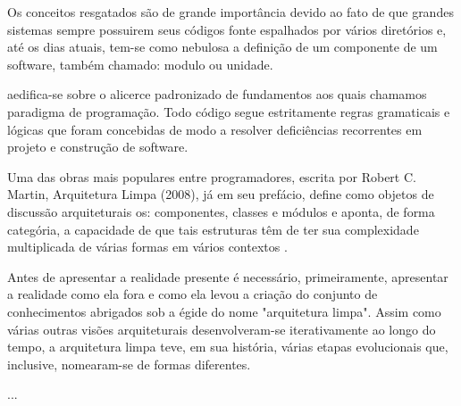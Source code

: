 
    Os conceitos resgatados são de grande importância devido ao fato de que grandes sistemas sempre
    possuirem seus códigos fonte espalhados por vários diretórios e, até os dias atuais, tem-se como
    nebulosa a definição de um componente de um software, também chamado: modulo ou unidade.

    aedifica-se sobre o alicerce padronizado de fundamentos aos quais chamamos paradigma de programação.
    Todo código segue estritamente regras gramaticais e lógicas que foram concebidas de modo a resolver
    deficiências recorrentes em projeto e construção de software.

    Uma das obras mais populares entre programadores, escrita por Robert C. Martin, Arquitetura Limpa (2008),
    já em seu prefácio, define como objetos de discussão arquiteturais os: componentes, classes e módulos
    e aponta, de forma categória, a capacidade de que tais estruturas têm de ter sua complexidade
    multiplicada de várias formas em vários contextos \cite{}.
        

    Antes de apresentar a realidade presente é necessário, primeiramente, apresentar a
    realidade como ela fora e como ela levou a criação do conjunto de conhecimentos abrigados
    sob a égide do nome "arquitetura limpa".
      Assim como várias outras visões arquiteturais desenvolveram-se iterativamente ao longo do tempo,
    a arquitetura limpa teve, em sua história, várias etapas evolucionais que, inclusive, nomearam-se de
    formas diferentes.
    
    ...



%
%
%
%




    
\newpage
